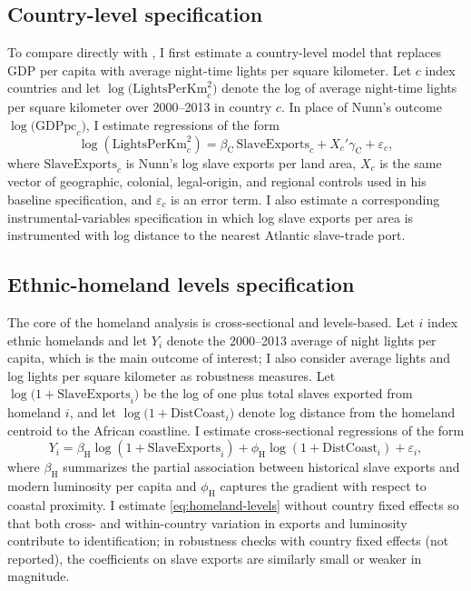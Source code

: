 \documentclass[12pt]{article}
\begin{document}
\subsection*{Country-level specification}

To compare directly with \citet{nunn2008}, I first estimate a country-level model that replaces GDP per capita with average night-time lights per square kilometer. Let $c$ index countries and let $\log\bigl(\text{LightsPerKm}^2_c\bigr)$ denote the log of average night-time lights per square kilometer over 2000--2013 in country $c$. In place of Nunn's outcome $\log\bigl(\text{GDPpc}_c\bigr)$, I estimate regressions of the form
\begin{equation}
\log\!\left(\text{LightsPerKm}^2_c\right)
=
\beta_{\text{C}} \,\text{SlaveExports}_c
+
X_c'\gamma_{\text{C}}
+
\varepsilon_c,
\label{eq:country-lights}
\end{equation}
where $\text{SlaveExports}_c$ is Nunn's log slave exports per land area, $X_c$ is the same vector of geographic, colonial, legal-origin, and regional controls used in his baseline specification, and $\varepsilon_c$ is an error term.\citep{nunn2008} I also estimate a corresponding instrumental-variables specification in which log slave exports per area is instrumented with log distance to the nearest Atlantic slave-trade port.

\subsection*{Ethnic-homeland levels specification}

The core of the homeland analysis is cross-sectional and levels-based. Let $i$ index ethnic homelands and let $Y_i$ denote the 2000--2013 average of night lights per capita, which is the main outcome of interest; I also consider average lights and log lights per square kilometer as robustness measures. Let $\log\bigl(1+\text{SlaveExports}_i\bigr)$ be the log of one plus total slaves exported from homeland $i$, and let $\log\bigl(1+\text{DistCoast}_i\bigr)$ denote log distance from the homeland centroid to the African coastline. I estimate cross-sectional regressions of the form
\begin{equation}
Y_i
=
\beta_{\text{H}} \log\!\left(1+\text{SlaveExports}_i\right)
+
\phi_{\text{H}} \log\!\left(1+\text{DistCoast}_i\right)
+
\varepsilon_i,
\label{eq:homeland-levels}
\end{equation}
where $\beta_{\text{H}}$ summarizes the partial association between historical slave exports and modern luminosity per capita and $\phi_{\text{H}}$ captures the gradient with respect to coastal proximity. I estimate \eqref{eq:homeland-levels} without country fixed effects so that both cross- and within-country variation in exports and luminosity contribute to identification; in robustness checks with country fixed effects (not reported), the coefficients on slave exports are similarly small or weaker in magnitude.
\end{document}
